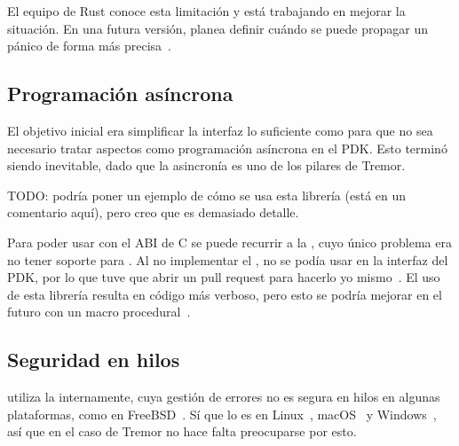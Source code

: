 El equipo de Rust conoce esta limitación y está trabajando en mejorar la
situación. En una futura versión, planea definir cuándo se puede propagar un
pánico de forma más precisa~\cite{cunwind}.

\subsection{Programación asíncrona}

El objetivo inicial era simplificar la interfaz lo suficiente como para que no
sea necesario tratar aspectos como programación asíncrona en el PDK. Esto
terminó siendo inevitable, dado que la asincronía es uno de los pilares de
Tremor.

TODO: podría poner un ejemplo de cómo se usa esta librería (está en un
comentario aquí), pero creo que es demasiado detalle.

%

Para poder usar  con el ABI de C se puede recurrir a la \crate
{}, cuyo único problema era no tener soporte para \abistable.
Al no implementar el \trait {}, no se podía usar en la interfaz
del PDK, por lo que tuve que abrir un pull request para hacerlo yo
mismo~\cite{asyncfficontrib}. El uso de esta librería resulta en código más
verboso, pero esto se podría mejorar en el futuro con un macro
procedural~\cite{asyncffimacro}.

\subsection{Seguridad en hilos}

\abistable utiliza la \crate {} internamente, cuya gestión
de errores no es segura en hilos en algunas plataformas, como  en
FreeBSD~\cite{thsafe_libloading}\cite{thsafe_openbsd}. Sí que lo es en
Linux~\cite{thsafe_linux}, macOS~\cite{thsafe_macos} y Windows~\cite{thsafe_ms},
así que en el caso de Tremor no hace falta preocuparse por esto.

